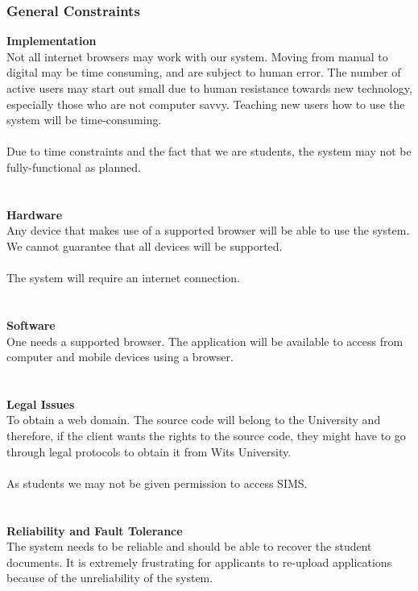 \documentclass{article}
\begin{document}
\subsubsection{General Constraints}
\textbf{Implementation} \\ 
Not all internet browsers may work with our system. Moving from manual to digital may be time consuming, and are subject to human error. The number of active users may start out small due to human resistance towards new technology, especially those who are not computer savvy. Teaching new users how to use the system will be time-consuming. \\ \\
Due to time constraints and the fact that we are students, the system may not be fully-functional as planned. \\ \\ \\
\textbf{Hardware} \\
Any device that makes use of a supported browser will be able to use the system. We cannot guarantee that all devices will be supported. \\ \\
The system will require an internet connection. \\ \\ \\
\textbf{Software}\\
One needs a supported browser. The application will be available to access from computer and mobile devices using a browser. \\ \\ \\
\textbf{Legal Issues} \\
To obtain a web domain. The source code will belong to the University and therefore, if the client wants the rights to the source code, they might have to go through legal protocols to obtain it from Wits University. \\ \\
As students we may not be given permission to access SIMS. \\ \\ \\
\textbf{Reliability and Fault Tolerance} \\
The system needs to be reliable and should be able to recover the student documents. It is extremely frustrating for applicants to re-upload applications because of the unreliability of the system.  \\ \\
\end{document}
